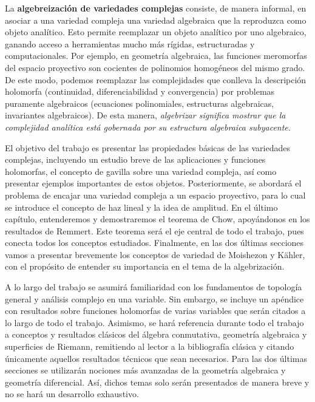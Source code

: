 La \textbf{algebreización de variedades complejas} consiste, de manera informal, en asociar a una variedad compleja una variedad algebraica que la reproduzca como objeto analítico. Esto permite reemplazar un objeto analítico por uno algebraico, ganando acceso a herramientas mucho más rígidas, estructuradas y computacionales. Por ejemplo, en geometría algebraica, las funciones meromorfas del espacio proyectivo son cocientes de polinomios homogéneos del mismo grado. De este modo, podemos reemplazar las complejidades que conlleva la descripción holomorfa (continuidad, diferenciabilidad y convergencia) por problemas puramente algebraicos (ecuaciones polinomiales, estructuras algebraicas, invariantes algebraicos). De esta manera, \textit{algebrizar significa mostrar que la complejidad analítica está gobernada por su estructura algebraica subyacente}.

El objetivo del trabajo es presentar las propiedades básicas de las variedades complejas, incluyendo un estudio breve de las aplicaciones y funciones holomorfas, el concepto de gavilla sobre una variedad compleja, así como presentar ejemplos importantes de estos objetos. Posteriormente, se abordará el problema de encajar una variedad compleja a un espacio proyectivo, para lo cual se introduce el concepto de haz lineal y la idea de amplitud. En el último capítulo, entenderemos y demostraremos el teorema de Chow, apoyándonos en los resultados de Remmert. Este teorema será el eje central de todo el trabajo, pues conecta todos los conceptos estudiados. Finalmente, en las dos últimas secciones vamos a presentar brevemente los conceptos de variedad de Moishezon y Kähler, con el propósito de entender su importancia en el tema de la algebrización. 

A lo largo del trabajo se asumirá familiaridad con los fundamentos de topología general y análisis complejo en una variable. Sin embargo, se incluye un apéndice con resultados sobre funciones holomorfas de varias variables que serán citados a lo largo de todo el trabajo. Asimismo, se hará referencia durante todo el trabajo a conceptos y resultados clásicos del álgebra conmutativa, geometría algebraica y superficies de Riemann, remitiendo al lector a la bibliografía clásica y citando únicamente aquellos resultados técnicos que sean necesarios. Para las dos últimas secciones se utilizarán nociones más avanzadas de la geometría algebraica y geometría diferencial. Así, dichos temas solo serán presentados de manera breve y no se hará un desarrollo exhaustivo.

